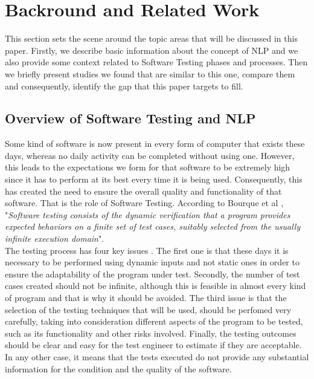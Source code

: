 \chapter*{Backround and Related Work}
This section sets the scene around the topic areas that will be discussed in this paper. Firstly, we describe basic information about the concept of NLP and we also 
provide some context related to Software Testing phases and processes. Then we briefly present studies we found that are similar to this one, compare them and consequently, 
identify the gap that this paper targets to fill. 

\section {Overview of Software Testing and NLP}

Some kind of software is now present in every form of computer that exists these days, whereas no daily activity can be completed without using one. However, this leads to the expectations we 
form for that software to be extremely high since it has to perform at its best every time it is being used. Consequently, this has created the need to ensure the overall quality and functionality of that 
software. That is the role of Software Testing. According to Bourque et al \cite{swebok}, "\emph{Software testing consists of the dynamic verification that a program provides expected behaviors on a 
finite set of test cases, suitably selected from the usually infinite execution domain}".\\

The testing process has four key issues \cite{swebok}. The first one is that these days it is necessary to be performed using dynamic 
inputs and not static ones in order to ensure the adaptability of the program under test. Secondly, the number of test cases created should not be infinite, although this is feasible in almost every kind 
of program and that is why it should be avoided. The third issue is that the selection of the testing techniques that will be used, should be perfomed very carefully, taking into consideration different 
aspects of the program to be tested, such as its functionality and other risks involved. Finally, the testing outcomes should be clear and easy for the test engineer to estimate if they are acceptable. 
In any other case, it means that the tests executed do not provide any substantial information for the condition and the quality of the software. \\

